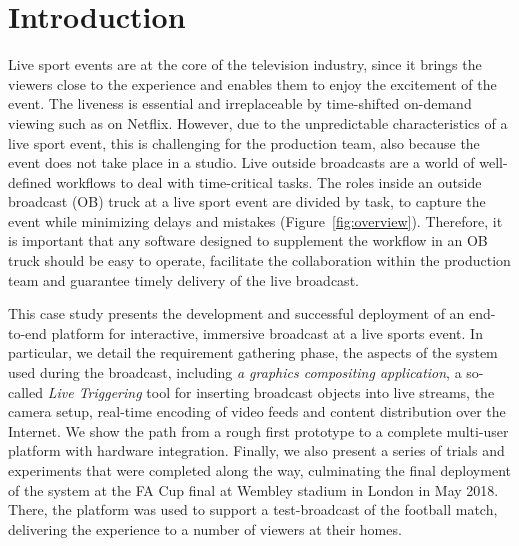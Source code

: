 \documentclass[sigchi-a, authorversion]{acmart}
\begin{document}

\maketitle

\section{Introduction}
 Live sport events are at the core of the television industry, since it brings
 the viewers close to the experience and enables them to enjoy the excitement of the
 event. The liveness is essential and irreplaceable by time-shifted on-demand viewing
 such as on Netflix\cite{matrix2014netflix}.
 However, due to the unpredictable characteristics of a live sport event, this
 is challenging for the production team, also because the event does not take
 place in a studio. Live outside broadcasts are a world of well-defined
 workflows to deal with time-critical tasks. The roles inside an outside broadcast
 (OB) truck at a live sport event are divided by task, to capture
 the event while minimizing delays and mistakes (Figure~\ref{fig:overview}). Therefore, it is
 important that any software designed to supplement the workflow in an OB truck
 should be easy to operate, facilitate the collaboration within the production team
 and guarantee timely delivery of the live broadcast.

 This case study presents the development and successful deployment of an
 end-to-end platform for interactive, immersive broadcast at
 a live sports event. In particular, we detail the requirement gathering phase,
 the aspects of the system used during the broadcast, including \emph{a graphics compositing
 application}, a so-called \emph{Live Triggering} tool for inserting broadcast objects
 into live streams, the camera setup, real-time encoding of video feeds and content
 distribution over the Internet.
 We show the path from a rough first prototype to a complete multi-user platform
 with hardware integration. Finally, we also present a series of trials and
 experiments that were completed along the way, culminating the final
 deployment of the system at the FA Cup final at Wembley stadium in London in
 May 2018. There, the platform was used to support a test-broadcast of the
 football match, delivering the experience to a number of viewers at
 their homes.
\end{document}
